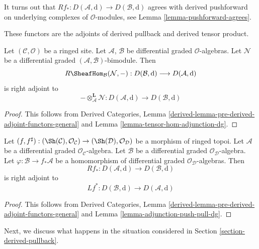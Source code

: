 \noindent
It turns out that
$Rf_* : D(\mathcal{A}, \text{d}) \to D(\mathcal{B}, \text{d})$
agrees with derived pushforward on underlying complexes
of $\mathcal{O}$-modules, see Lemma \ref{lemma-pushforward-agrees}.

\medskip\noindent
These functors are the adjoints of derived pullback and
derived tensor product.

\begin{lemma}
\label{lemma-derived-adjoint-tensor-hom}
Let $(\mathcal{C}, \mathcal{O})$ be a ringed site. Let
$\mathcal{A}$, $\mathcal{B}$ be differential graded $\mathcal{O}$-algebras.
Let $\mathcal{N}$ be a  differential graded
$(\mathcal{A}, \mathcal{B})$-bimodule. Then
$$
R\SheafHom_\mathcal{B}(\mathcal{N}, -) :
D(\mathcal{B}, \text{d})
\longrightarrow
D(\mathcal{A}, \text{d})
$$
is right adjoint to
$$
- \otimes_\mathcal{A}^\mathbf{L} \mathcal{N} :
D(\mathcal{A}, \text{d})
\longrightarrow
D(\mathcal{B}, \text{d})
$$
\end{lemma}

\begin{proof}
This follows from Derived Categories, Lemma
\ref{derived-lemma-pre-derived-adjoint-functors-general}
and Lemma \ref{lemma-tensor-hom-adjunction-dg}.
\end{proof}

\begin{lemma}
\label{lemma-derived-adjoint-push-pull}
Let $(f, f^\sharp) : (\Sh(\mathcal{C}), \mathcal{O}_\mathcal{C})
\to (\Sh(\mathcal{D}), \mathcal{O}_\mathcal{D})$
be a morphism of ringed topoi. Let $\mathcal{A}$ be a differential
graded $\mathcal{O}_\mathcal{C}$-algebra. Let $\mathcal{B}$ be a
differential graded $\mathcal{O}_\mathcal{D}$-algebra. Let
$\varphi : \mathcal{B} \to f_*\mathcal{A}$ be a homomorphism
of differential graded $\mathcal{O}_\mathcal{D}$-algebras.
Then
$$
Rf_* : 
D(\mathcal{A}, \text{d})
\longrightarrow
D(\mathcal{B}, \text{d})
$$
is right adjoint to
$$
Lf^* :
D(\mathcal{B}, \text{d})
\longrightarrow
D(\mathcal{A}, \text{d})
$$
\end{lemma}

\begin{proof}
This follows from Derived Categories, Lemma
\ref{derived-lemma-pre-derived-adjoint-functors-general}
and Lemma \ref{lemma-adjunction-push-pull-dg}.
\end{proof}

\noindent
Next, we discuss what happens in the situation considered in
Section \ref{section-derived-pullback}.

